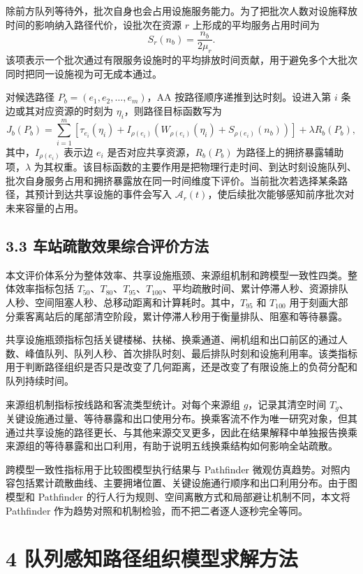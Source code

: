 \documentclass[UTF8,a4paper,12pt]{ctexart}
\begin{document}
除前方队列等待外，批次自身也会占用设施服务能力。为了把批次人数对设施释放时间的影响纳入路径代价，设批次在资源 \(r\) 上形成的平均服务占用时间为
\[
S_r(n_b)=\frac{n_b}{2\mu_r}.
\]
该项表示一个批次通过有限服务设施时的平均排放时间贡献，用于避免多个大批次同时把同一设施视为可无成本通过。

对候选路径 \(P_b=(e_1,e_2,\ldots,e_m)\)，AA 按路径顺序递推到达时刻。设进入第 \(i\) 条边或其对应资源的时刻为 \(\eta_i\)，则路径目标函数写为
\[
J_b(P_b)=\sum_{i=1}^{m}\left[\tau_{e_i}(\eta_i)+I_{\rho(e_i)}\left(W_{\rho(e_i)}(\eta_i)+S_{\rho(e_i)}(n_b)\right)\right]+\lambda R_b(P_b),
\]
其中，\(I_{\rho(e_i)}\) 表示边 \(e_i\) 是否对应共享资源，\(R_b(P_b)\) 为路径上的拥挤暴露辅助项，\(\lambda\) 为其权重。该目标函数的主要作用是把物理行走时间、到达时刻设施队列、批次自身服务占用和拥挤暴露放在同一时间维度下评价。当前批次若选择某条路径，其预计到达共享设施的事件会写入 \(\mathcal{A}_r(t)\)，使后续批次能够感知前序批次对未来容量的占用。

\subsection{3.3 车站疏散效果综合评价方法}

本文评价体系分为整体效率、共享设施瓶颈、来源组机制和跨模型一致性四类。整体效率指标包括 \(T_{50}\)、\(T_{80}\)、\(T_{95}\)、\(T_{100}\)、平均疏散时间、累计停滞人秒、资源排队人秒、空间阻塞人秒、总移动距离和计算耗时。其中，\(T_{95}\) 和 \(T_{100}\) 用于刻画大部分乘客离站后的尾部清空阶段，累计停滞人秒用于衡量排队、阻塞和等待暴露。

共享设施瓶颈指标包括关键楼梯、扶梯、换乘通道、闸机组和出口前区的通过人数、峰值队列、队列人秒、首次排队时刻、最后排队时刻和设施利用率。该类指标用于判断路径组织是否只是改变了几何距离，还是改变了有限设施上的负荷分配和队列持续时间。

来源组机制指标按线路和客流类型统计。对每个来源组 \(g\)，记录其清空时间 \(T_g\)、关键设施通过量、等待暴露和出口使用分布。换乘客流不作为唯一研究对象，但其通过共享设施的路径更长、与其他来源交叉更多，因此在结果解释中单独报告换乘来源组的等待暴露和出口利用，有助于说明五线换乘结构如何影响全站疏散。

跨模型一致性指标用于比较图模型执行结果与 Pathfinder 微观仿真趋势。对照内容包括累计疏散曲线、主要拥堵位置、关键设施通行顺序和出口利用分布。由于图模型和 Pathfinder 的行人行为规则、空间离散方式和局部避让机制不同，本文将 Pathfinder 作为趋势对照和机制检验，而不把二者逐人逐秒完全等同。

\section{4 队列感知路径组织模型求解方法}
\end{document}
